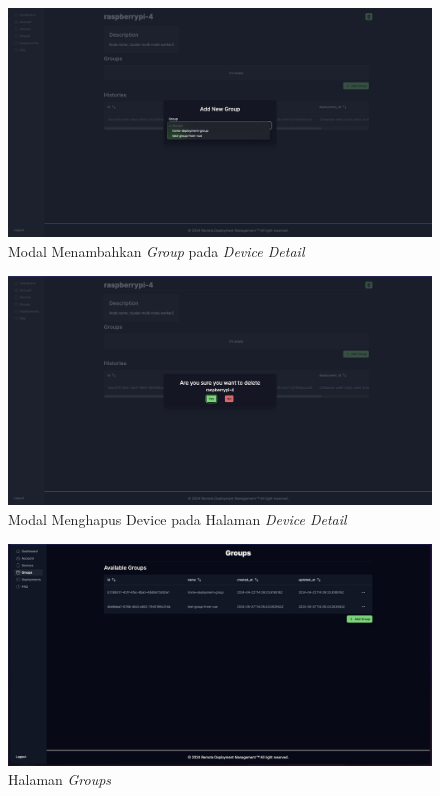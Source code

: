 \begin{figure}[ht]
  \centering
  \includegraphics[width=1\textwidth]{resources/chapter-4/dashboard/device-detail-add-group.jpg}
  \caption{Modal Menambahkan \textit{Group} pada \textit{Device Detail}}
  \label{fig:halaman-device-detail-add-group}
\end{figure}

\begin{figure}[ht]
  \centering
  \includegraphics[width=1\textwidth]{resources/chapter-4/dashboard/device-detail-delete.jpg}
  \caption{Modal Menghapus Device pada Halaman \textit{Device Detail}}
  \label{fig:halaman-device-detail-delete}
\end{figure}

\begin{figure}[ht]
  \centering
  \includegraphics[width=1\textwidth]{resources/chapter-4/dashboard/groups-page.jpg}
  \caption{Halaman \textit{Groups}}
  \label{fig:halaman-groups}
\end{figure}

